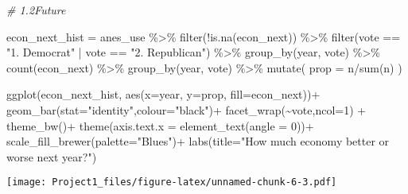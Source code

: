\documentclass[
]{article}
\newenvironment{Shaded}{\begin{snugshade}}{\end{snugshade}}
\newcommand{\AttributeTok}[1]{\textcolor[rgb]{0.77,0.63,0.00}{#1}}
\newcommand{\CommentTok}[1]{\textcolor[rgb]{0.56,0.35,0.01}{\textit{#1}}}
\newcommand{\DecValTok}[1]{\textcolor[rgb]{0.00,0.00,0.81}{#1}}
\newcommand{\FunctionTok}[1]{\textcolor[rgb]{0.00,0.00,0.00}{#1}}
\newcommand{\NormalTok}[1]{#1}
\newcommand{\OtherTok}[1]{\textcolor[rgb]{0.56,0.35,0.01}{#1}}
\newcommand{\SpecialCharTok}[1]{\textcolor[rgb]{0.00,0.00,0.00}{#1}}
\newcommand{\StringTok}[1]{\textcolor[rgb]{0.31,0.60,0.02}{#1}}
\begin{document}
\begin{Shaded}
\begin{Highlighting}[]
\CommentTok{\# 1.2Future}

\NormalTok{econ\_next\_hist }\OtherTok{=}\NormalTok{ anes\_use }\SpecialCharTok{\%\textgreater{}\%}
  \FunctionTok{filter}\NormalTok{(}\SpecialCharTok{!}\FunctionTok{is.na}\NormalTok{(econ\_next))  }\SpecialCharTok{\%\textgreater{}\%}
  \FunctionTok{filter}\NormalTok{(vote }\SpecialCharTok{==} \StringTok{"1. Democrat"} \SpecialCharTok{|}\NormalTok{ vote }\SpecialCharTok{==} \StringTok{"2. Republican"}\NormalTok{) }\SpecialCharTok{\%\textgreater{}\%}
  \FunctionTok{group\_by}\NormalTok{(year, vote) }\SpecialCharTok{\%\textgreater{}\%}
  \FunctionTok{count}\NormalTok{(econ\_next) }\SpecialCharTok{\%\textgreater{}\%}
  \FunctionTok{group\_by}\NormalTok{(year, vote) }\SpecialCharTok{\%\textgreater{}\%}
  \FunctionTok{mutate}\NormalTok{(}
    \AttributeTok{prop =}\NormalTok{ n}\SpecialCharTok{/}\FunctionTok{sum}\NormalTok{(n)}
\NormalTok{  )}
 
\FunctionTok{ggplot}\NormalTok{(econ\_next\_hist,}
       \FunctionTok{aes}\NormalTok{(}\AttributeTok{x=}\NormalTok{year, }\AttributeTok{y=}\NormalTok{prop, }\AttributeTok{fill=}\NormalTok{econ\_next))}\SpecialCharTok{+}
  \FunctionTok{geom\_bar}\NormalTok{(}\AttributeTok{stat=}\StringTok{"identity"}\NormalTok{,}\AttributeTok{colour=}\StringTok{"black"}\NormalTok{)}\SpecialCharTok{+}
  \FunctionTok{facet\_wrap}\NormalTok{(}\SpecialCharTok{\textasciitilde{}}\NormalTok{vote,}\AttributeTok{ncol=}\DecValTok{1}\NormalTok{) }\SpecialCharTok{+}
  \FunctionTok{theme\_bw}\NormalTok{()}\SpecialCharTok{+}
  \FunctionTok{theme}\NormalTok{(}\AttributeTok{axis.text.x =} \FunctionTok{element\_text}\NormalTok{(}\AttributeTok{angle =} \DecValTok{0}\NormalTok{))}\SpecialCharTok{+}
  \FunctionTok{scale\_fill\_brewer}\NormalTok{(}\AttributeTok{palette=}\StringTok{"Blues"}\NormalTok{)}\SpecialCharTok{+}
  \FunctionTok{labs}\NormalTok{(}\AttributeTok{title=}\StringTok{"How much economy better or worse next year?"}\NormalTok{)}
\end{Highlighting}
\end{Shaded}

\texttt{[image: Project1\_files/figure-latex/unnamed-chunk-6-3.pdf]}
\end{document}
